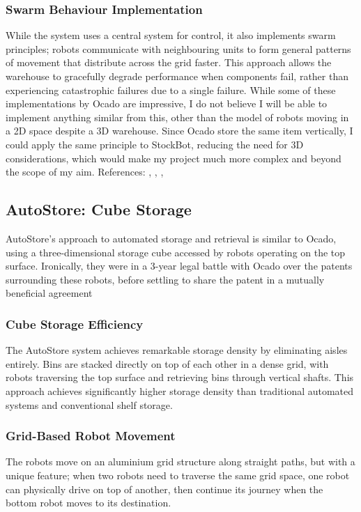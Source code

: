 \subsubsection{Swarm Behaviour Implementation}
While the system uses a central system for control, it also implements swarm principles; robots communicate with neighbouring units to form general patterns of movement that distribute across the grid faster. This approach allows the warehouse to gracefully degrade performance when components fail, rather than experiencing catastrophic failures due to a single failure. \newline
\textbf{ }
\newline While some of these implementations by Ocado are impressive, I do not believe I will be able to implement anything similar from this, other than the model of robots moving in a 2D space despite a 3D warehouse. Since Ocado store the same item vertically, I could apply the same principle to StockBot, reducing the need for 3D considerations, which would make my project much more complex and beyond the scope of my aim. \newline References: \cite{a2024_joseph}, \cite{group_2024_the}, \cite{group_2023_the}, \cite{group_2020_explained}

\subsection{AutoStore: Cube Storage}

AutoStore's approach to automated storage and retrieval is similar to Ocado, using a three-dimensional storage cube accessed by robots operating on the top surface. Ironically, they were in a 3-year legal battle with Ocado over the patents surrounding these robots, before settling to share the patent in a mutually beneficial agreement \cite{speed_2023_ocado}

\subsubsection{Cube Storage Efficiency}
The AutoStore system achieves remarkable storage density by eliminating aisles entirely. Bins are stacked directly on top of each other in a dense grid, with robots traversing the top surface and retrieving bins through vertical shafts. This approach achieves significantly higher storage density than traditional automated systems and conventional shelf storage.

\subsubsection{Grid-Based Robot Movement}
The robots move on an aluminium grid structure along straight paths, but with a unique feature; when two robots need to traverse the same grid space, one robot can physically drive on top of another, then continue its journey when the bottom robot moves to its destination.

